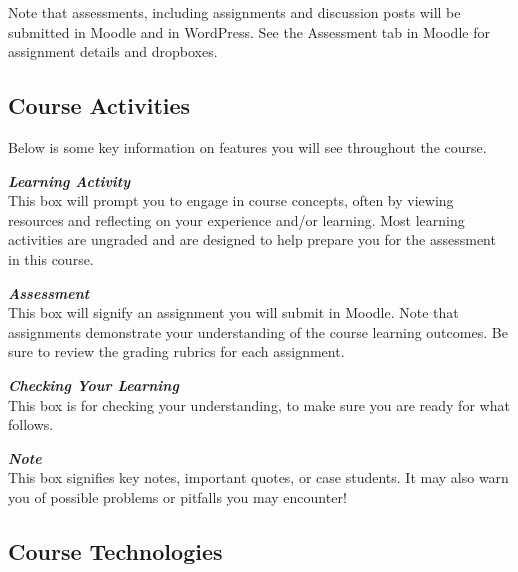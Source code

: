 \documentclass[
]{book}
\theoremstyle{definition}
\theoremstyle{definition}
\theoremstyle{definition}
\theoremstyle{definition}
\theoremstyle{remark}
\begin{document}
\begin{caution}
 Note that assessments, including assignments and discussion posts will
 be submitted in Moodle and in WordPress. See the Assessment tab in
 Moodle for assignment details and dropboxes.
 \end{caution}

\hypertarget{course-activities}{%
\subsection*{Course Activities}\label{course-activities}}

Below is some key information on features you will see throughout the course.

\begin{reflect}
\textbf{\emph{Learning Activity}}\\
This box will prompt you to engage in course concepts, often by viewing
resources and reflecting on your experience and/or learning. Most
learning activities are ungraded and are designed to help prepare you
for the assessment in this course.
\end{reflect}

\begin{assessment}
\textbf{\emph{Assessment}}\\
This box will signify an assignment you will submit in Moodle. Note that
assignments demonstrate your understanding of the course learning
outcomes. Be sure to review the grading rubrics for each assignment.
\end{assessment}

\begin{progress}
\textbf{\emph{Checking Your Learning}}\\
This box is for checking your understanding, to make sure you are ready
for what follows.
\end{progress}

\begin{feedback}
\textbf{\emph{Note}}\\
This box signifies key notes, important quotes, or case students. It may
also warn you of possible problems or pitfalls you may encounter!
\end{feedback}

\hypertarget{course-technologies}{%
\subsection*{Course Technologies}\label{course-technologies}}
\end{document}
